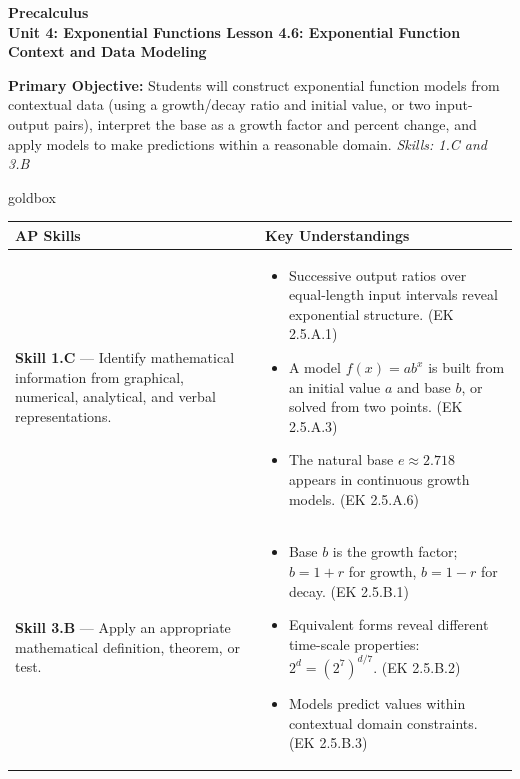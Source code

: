 \documentclass[10pt]{article}
\newcommand{\CourseName}{Precalculus}
\newcommand{\UnitNumberName}{Unit 4: Exponential Functions \quad}
\newcommand{\LessonNumberName}{Lesson 4.6: Exponential Function Context and Data Modeling}
\begin{document}
\begin{center}
    {\Large\bfseries \CourseName \\
    {\small\bfseries \UnitNumberName \LessonNumberName}}
\end{center}

\begin{tcolorbox}[colback=sky, colframe=navy, boxrule=0.9pt, arc=2mm,
    left=2mm, right=2mm, top=1.5mm, bottom=1.5mm]
    \textbf{Primary Objective:} Students will construct exponential function models from
    contextual data (using a growth/decay ratio and initial value, or two input-output pairs),
    interpret the base as a growth factor and percent change, and apply models to make
    predictions within a reasonable domain.
    \hfill\textit{\small Skills: 1.C and 3.B}
\end{tcolorbox}

\renewcommand{\arraystretch}{1.6}
\begin{skillbox}{goldbox}
\begin{tabularx}{\linewidth}{@{}X X@{}}
\textbf{AP Skills} &
\textbf{Key Understandings} \\
\midrule
\textbf{Skill 1.C} --- Identify mathematical information from graphical, numerical, analytical, and verbal representations. &
\begin{itemize}[leftmargin=1.2em,itemsep=2pt,topsep=0pt]
  \item Successive output ratios over equal-length input intervals reveal exponential structure. (EK 2.5.A.1)
  \item A model $f(x) = ab^x$ is built from an initial value $a$ and base $b$, or solved from two points. (EK 2.5.A.3)
  \item The natural base $e \approx 2.718$ appears in continuous growth models. (EK 2.5.A.6)
\end{itemize} \\
\textbf{Skill 3.B} --- Apply an appropriate mathematical definition, theorem, or test. &
\begin{itemize}[leftmargin=1.2em,itemsep=2pt,topsep=0pt]
  \item Base $b$ is the growth factor; $b = 1+r$ for growth, $b = 1-r$ for decay. (EK 2.5.B.1)
  \item Equivalent forms reveal different time-scale properties: $2^d = (2^7)^{d/7}$. (EK 2.5.B.2)
  \item Models predict values within contextual domain constraints. (EK 2.5.B.3)
\end{itemize} \\
\end{tabularx}
\end{skillbox}
\end{document}
